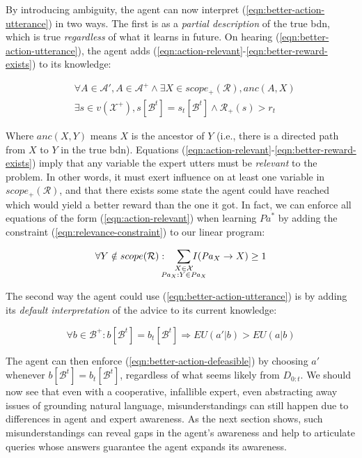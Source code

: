 \documentclass{article}
\newcommand{\bdn}{{\sc bdn}}
\newcommand{\Pa}{\mathit{Pa}}
\begin{document}
	By introducing ambiguity, the agent can now interpret (\ref{eqn:better-action-utterance}) in two ways. The first is as a \emph{partial description} of the true \bdn{}, which is true \emph{regardless} of what it learns in future. On hearing (\ref{eqn:better-action-utterance}), the agent adds (\ref{eqn:action-relevant}-\ref{eqn:better-reward-exists}) to its knowledge:
	
	\begin{align}
	\label{eqn:action-relevant}
	&\forall A \in \mathcal{A}', A \in \mathcal{A}^+ \wedge \exists X \in scope_+(\mathcal{R}), anc(A, X) \\
	\label{eqn:better-reward-exists}
	&\exists s \in v(\mathcal{X}^+), s[\mathcal{B}^t] = s_t[\mathcal{B}^t] \wedge \mathcal{R}_+(s) > r_t
	\end{align}
		
	Where $anc(X,Y)$ means $X$ is the ancestor of $Y$ (i.e., there is a directed path from $X$ to $Y$ in the true \bdn{}). Equations (\ref{eqn:action-relevant}-\ref{eqn:better-reward-exists}) imply that any variable the expert utters must be \emph{relevant} to the problem. In other words, it must exert influence on at least one variable in $scope_+(\mathcal{R})$, and that there exists some state the agent could have reached which would yield a better reward than the one it got. In fact, we can enforce all equations of the form (\ref{eqn:action-relevant}) when learning $\Pa^*$ by adding the constraint (\ref{eqn:relevance-constraint}) to our linear program:
	
	\begin{equation}
	\label{eqn:relevance-constraint}
	\forall Y \notin scope(\mathcal{R}):\quad \sum_{\mathclap{\substack{X \in \mathcal{X} \\ \Pa_X : Y \in \Pa_X}}} I(\Pa_X \rightarrow X) \geq 1
	\end{equation} 
		
	The second way the agent could use (\ref{eqn:better-action-utterance}) is by adding its \emph{default interpretation} of the advice to its current knowledge:

	\begin{equation}
	\label{eqn:better-action-defeasible}
	\forall b \in \mathcal{B}^+: b[\mathcal{B}^t] = b_t[\mathcal{B}^t] \Rightarrow EU(a' | b) > EU(a | b)
	\end{equation}
	
	The agent can then enforce (\ref{eqn:better-action-defeasible}) by choosing $a'$ whenever $b[\mathcal{B}^t] = b_t[\mathcal{B}^t]$, regardless of what seems likely from $D_{0:t}$. We should now see that even with a cooperative, infallible expert, even abstracting away issues of grounding natural language, misunderstandings can still happen due to differences in agent and expert awareness. As the next section shows, such misunderstandings can reveal gaps in the agent's awareness and help to articulate queries whose answers guarantee the agent expands its awareness.
	
\end{document}
